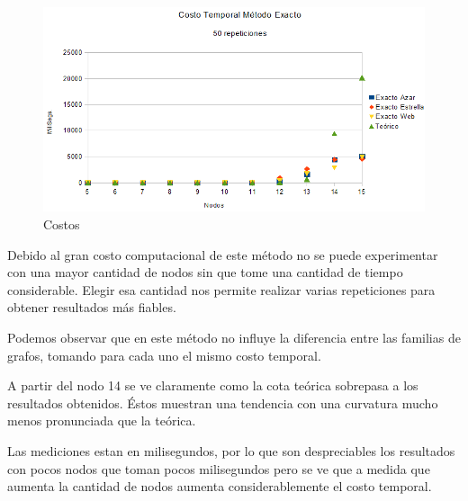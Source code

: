 \begin{figure}[H]
	\centering
	\includegraphics[scale=0.8]{timingExacto.png}
\caption{Costos}
\end{figure}

\quad Debido al gran costo computacional de este método no se puede experimentar con una mayor cantidad de nodos sin que tome una cantidad de tiempo considerable. Elegir esa cantidad nos permite realizar varias repeticiones para obtener resultados más fiables.

\quad Podemos observar que en este método no influye la diferencia entre las familias de grafos, tomando para cada uno el mismo costo temporal. 

\quad A partir del nodo 14 se ve claramente como la cota teórica sobrepasa a los resultados obtenidos. Éstos muestran una tendencia con una curvatura mucho menos pronunciada que la teórica.

\quad Las mediciones estan en milisegundos, por lo que son despreciables los resultados con pocos nodos que toman pocos milisegundos pero se ve que a medida que aumenta la cantidad de nodos aumenta considerablemente el costo temporal.
